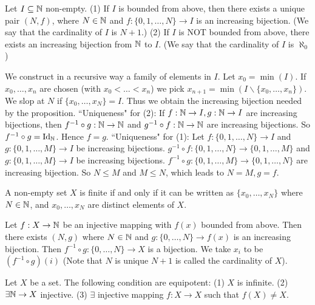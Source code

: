 \begin{propositionenv}
    Let $I\subseteq \mathbb{N}$ non-empty.
    \newline
    (1) If $I$ is bounded from above,  then there exists a unique pair $(N, f)$,  where $N\in \mathbb{N}$ and $f:\{0, 1, \dots, N\}\rightarrow I$ is an increasing bijection. (We say that the cardinality of $I$ is $N+1$.)
    \newline
    (2) If $I$ is NOT bounded from above,  there exists an increasing bijection from $\mathbb{N}$ to $I$. (We say that the cardinality of $I$ is $\aleph_0$) 
\end{propositionenv}
\begin{proofenv}
    We construct in a recursive way a family of elements in $I$. Let $x_0=\min(I)$. If $x_0, \dots , x_n$ are chosen (with $x_0<\dots<x_n$) we pick $x_{n+1}=\min(I\backslash\{x_0, \dots, x_n\})$. We slop at $N$ if $\{x_0, \dots, x_N\}=I$. Thus we obtain the increasing bijection needed by the proposition.
    \newline
    ``Uniqueness" for (2): If $f:\mathbb{N}\rightarrow I, g:\mathbb{N}\rightarrow I$ are increasing bijections,  then $f^{-1}\circ g:\mathbb{N}\rightarrow\mathbb{N}$ and $g^{-1}\circ f:\mathbb{N}\rightarrow\mathbb{N}$ are increasing bijections. So $f^{-1}\circ g=\mathrm{Id}_{\mathbb{N}}$. Hence $f=g$.
    \newline
    ``Uniqueness" for (1): Let $f:\{0, 1, \dots, N\}\rightarrow I$ and $g:\{0, 1, \dots, M\}\rightarrow I$ be increasing bijections. $g^{-1}\circ f:\{0, 1, \dots, N\}\rightarrow \{0, 1, \dots,  M\}$ and $g:\{0, 1, \dots, M\}\rightarrow I$ be increasing bijections. $f^{-1}\circ g:\{0, 1, \dots, M\}\rightarrow \{0, 1, \dots,  N\}$ are increasing bijection. So $N\le M$ and $M\le N$,  which leads to $N=M, g=f$. 
\end{proofenv}
\begin{corollaryenv}
    A non-empty set $X$ is finite if and only if it can be written as $\{x_0, \dots, x_N\}$ where $N\in \mathbb{N}$,  and $x_0, \dots, x_N$ are distinct elements of $X$.
\end{corollaryenv}
\begin{proofenv}
    Let $f:X\rightarrow \mathbb{N}$ be an injective mapping with $f(x)$ bounded from above. Then there exists $(N, g)$ where $N\in \mathbb{N}$ and $g:\{0, \dots , N\}\rightarrow f(x)$ is an increasing bijection. Then $f^{-1}\circ g:\{0, \dots, N\}\rightarrow X$ is a bijection. We take $x_i$ to be $(f^{-1}\circ g)(i)$ (Note that $N$ is unique $N+1$ is called the cardinality of $X$).
\end{proofenv}
\begin{propositionenv}
    Let $X$ be a set. The following condition are equipotent:
    \newline
    (1) $X$ is infinite.
    \newline
    (2) $\exists \mathbb{N}\rightarrow X$ injective.
    \newline
    (3) $\exists$ injective mapping $f:X\rightarrow X$ such that $f(X)\not=X$.
\end{propositionenv}
